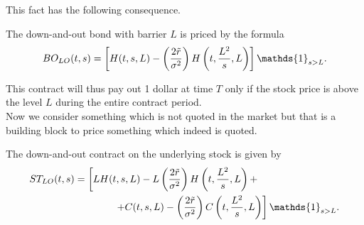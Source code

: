 This fact has the following consequence. 
\begin{proposition}
    The down-and-out bond with barrier $L$ is priced by the formula
    \begin{equation}
        BO_{LO}(t,s) = \left[H(t,s,L) - \left(\dfrac{2\Tilde{r}}{\sigma^2}\right)H\left(t,\frac{L^2}{s},L\right)\right]\mathds{1}_{s>L}.
    \end{equation}
\end{proposition}
This contract will thus pay out 1 dollar at time $T$ only if the stock price is above the level $L$ during the entire contract period. \\
Now we consider something which is not quoted in the market but that is a building block to price something which indeed is quoted.
\begin{proposition}
    The down-and-out contract on the underlying stock is given by
    \begin{align}
        \notag ST_{LO}(t,s) &= \left[LH(t,s,L) - L\left(\dfrac{2\Tilde{r}}{\sigma^2}\right)H\left(t,\frac{L^2}{s},L\right) + \right. \\
        &\qquad\qquad
        \left. + C(t,s,L) - \left(\dfrac{2\Tilde{r}}{\sigma^2}\right)C\left(t,\frac{L^2}{s},L\right)\right]\mathds{1}_{s>L}.
    \end{align}
\end{proposition}
